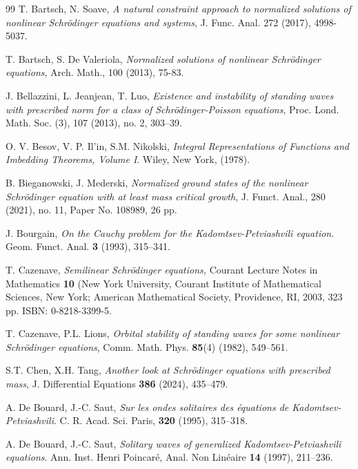 \documentclass[11pt]{amsart}
\numberwithin{equation}{section}
\begin{document}
{{{\begin{thebibliography}{99}
 T. Bartsch, N. Soave, {\it A natural constraint approach to normalized solutions of nonlinear Schr\"odinger equations and systems}, J. Func. Anal. 272 (2017), 4998-5037.

 T. Bartsch, S. De Valeriola, {\it Normalized solutions of nonlinear Schr\"odinger equations},  Arch.
Math., 100 (2013), 75-83.

 J. Bellazzini, L. Jeanjean, T. Luo, {\it Existence and instability of standing waves with prescribed norm for a class of
    Schr\"odinger-Poisson equations}, Proc. Lond. Math. Soc. (3), 107 (2013), no. 2, 303--39.

 O. V. Besov, V. P. Il'in, S.M. Nikolski, \emph{Integral Representations of Functions and Imbedding Theorems, Volume I}. Wiley, New York, (1978).

 B. Bieganowski, J. Mederski, {\it Normalized ground states of the nonlinear Schr\"odinger equation with at least mass critical growth},
J. Funct. Anal., 280 (2021), no. 11, Paper No. 108989, 26 pp.

 J. Bourgain, \emph{On the Cauchy problem for the Kadomtsev-Petviashvili equation}. Geom. Funct. Anal. \textbf{3} (1993), 315--341.


 T. Cazenave, {\it Semilinear Schr\"odinger equations,} Courant Lecture Notes in Mathematics {\bf 10 }(New York University, Courant Institute of Mathematical Sciences, New York; American Mathematical Society, Providence, RI, 2003, 323 pp. ISBN: 0-8218-3399-5.


 T. Cazenave,  P.L. Lions, \emph{ Orbital stability of standing waves for some nonlinear Schr\"odinger equations},  Comm.
Math. Phys.  \textbf{85}(4) (1982), 549--561.


S.T. Chen, X.H. Tang,
\textit{Another look at Schr\"odinger equations with prescribed mass},
J. Differential Equations \textbf{386} (2024), 435--479.

A. De Bouard, J.-C. Saut, \emph{Sur les ondes solitaires des \'{e}quations de Kadomtsev-Petviashvili}. C. R. Acad. Sci. Paris, \textbf{320} (1995), 315--318.


A. De Bouard, J.-C. Saut, \emph{Solitary waves of generalized Kadomtsev-Petviashvili equations}. Ann. Inst. Henri Poincar\'{e}, Anal. Non Lin\'{e}aire \textbf{14} (1997),  211--236.


\end{thebibliography}}}}
\end{document}
